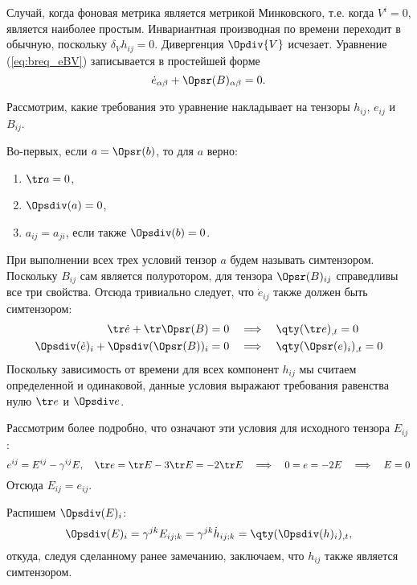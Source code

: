 \documentclass[\docroot/reports/draft/report.tex]{subfiles}
\begin{document}
    Случай, когда фоновая метрика является метрикой Минковского, т.е. когда $V^i = 0$, является наиболее простым. Инвариантная производная по времени переходит в обычную, поскольку $\delta_V{h_{ij}} = 0$. Дивергенция $\Opdiv{V}$ исчезает. Уравнение (\ref{eq:breq_eBV}) записывается в простейшей форме
    \begin{equation}
        \dot{e}_{\alpha\beta} + \Opsr(B)_{\alpha\beta} = 0 .
    \end{equation}

    Рассмотрим, какие требования это уравнение накладывает на тензоры $h_{ij}$, $e_{ij}$ и $B_{ij}$.

    Во-первых, если $a = \Opsr(b)$, то для $a$ верно:
    \begin{enumerate}[nosep]
        \item $\tr a = 0$,
        \item $\Opsdiv(a) = 0$,
        \item $a_{ij} = a_{ji}$, если также $\Opsdiv(b) = 0$.
    \end{enumerate}

    При выполнении всех трех условий тензор $a$ будем называть симтензором. Поскольку $B_{ij}$ сам является полуротором, для тензора $\Opsr(B)_{ij}$ справедливы все три свойства. Отсюда тривиально следует, что $\dot{e}_{ij}$ также должен быть симтензором:
    \begin{align*}
        \tr \dot{e} + \tr \Opsr(B) = 0
            \quad&\Longrightarrow\quad \qty(\tr e)_{,t} = 0 \\
        \Opsdiv(\dot{e})_i + \Opsdiv(\Opsr(B))_i = 0
            \quad&\Longrightarrow\quad \qty(\Opsr(e)_i)_{,t} = 0
    \end{align*}
    Поскольку зависимость от времени для всех компонент $h_{ij}$ мы считаем определенной и одинаковой, данные условия выражают требования равенства нулю $\tr e$ и $\Opsdiv e$.

    Рассмотрим более подробно, что означают эти условия для исходного тензора $E_{ij}$:
    \begin{equation*}
        e^{ij} = E^{ij} - \gamma^{ij} E , \quad
        \tr e = \tr E - 3 \tr E = -2 \tr E \quad\Longrightarrow\quad
        0 = e = -2E \quad\Longrightarrow\quad
        E = 0
    \end{equation*}
    Отсюда $E_{ij} = e_{ij}$.

    Распишем $\Opsdiv(E)_i$:
    \begin{equation*}
        \Opsdiv(E)_i
            = \gamma^{jk} E_{ij;k}
            = \gamma^{jk} \dot{h}_{ij;k}
            = \qty(\Opsdiv(h)_i)_{,t} ,
    \end{equation*}
    откуда, следуя сделанному ранее замечанию, заключаем, что $h_{ij}$ также является симтензором.
\end{document}
